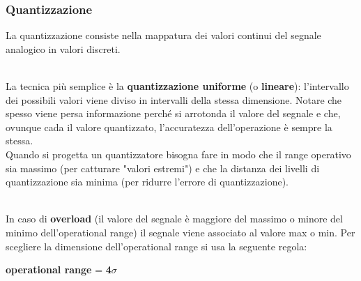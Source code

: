 \documentclass{article}
\begin{document}
			\subsubsection{Quantizzazione}	
				La quantizzazione consiste nella mappatura dei valori continui del segnale analogico in valori discreti.
				\begin{figure}[ht!]
				\end{figure}
				\\La tecnica più semplice è la \textbf{quantizzazione uniforme} (o \textbf{lineare}): l'intervallo dei possibili valori viene diviso in intervalli della stessa dimensione.
				\newpage 
				\noindent 
				Notare che spesso viene persa informazione perché si arrotonda il valore del segnale e che, ovunque cada il valore quantizzato, l'accuratezza dell'operazione è sempre la stessa.
				\\Quando si progetta un quantizzatore bisogna fare in modo che il range operativo sia massimo (per catturare "valori estremi") e che la distanza dei livelli di quantizzazione sia minima (per ridurre l'errore di quantizzazione).
				\begin{figure}[ht!]
				\end{figure}
				\\In caso di \textbf{overload} (il valore del segnale è maggiore del massimo o minore del minimo dell'operational range) il segnale viene associato al valore max o min. Per scegliere la dimensione dell'operational range si usa la seguente regola:
				\begin{center}
					\textbf{operational range} = \textbf{4$\sigma$}
				\end{center}
				
\end{document}
